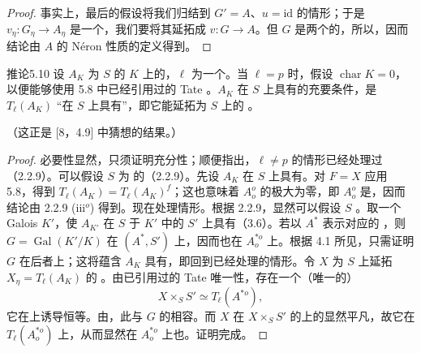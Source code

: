 \begin{proof}
事实上，最后的假设将我们归结到 $G'=A$、$u=\mathrm{id}$ 的情形；于是 $v_\eta:G_\eta\to A_\eta$ 是一个，我们要将其延拓成 $v:G\to A$。但 $G$ 是两个的，所以，因而结论由 $A$ 的 Néron 性质的定义得到。
\end{proof}

\begin{SGAresult}{推论}{5.10}
设 $A_K$ 为 $S$ 的 $K$ 上的，$\ell$ 为一个。当 $\ell=p$ 时，假设 $\operatorname{char}K=0$，以便能够使用 5.8 中已经引用过的 Tate 。$A_K$ 在 $S$ 上具有的充要条件，是  $T_\ell(A_K)$ “在 $S$ 上具有”，即它能延拓为 $S$ 上的 。
\end{SGAresult}
（这正是 [8，4.9] 中猜想的结果。）
\begin{proof}
必要性显然，只须证明充分性；顺便指出，$\ell\ne p$ 的情形已经处理过（2.2.9）。可以假设 $S$ 为  的（2.2.9）。先设 $A_K$ 在 $S$ 上具有。对 $F=X$ 应用 5.8，得到 $T_\ell(A_K)=T_\ell(A_K)^f$；这也意味着 $A_o^o$ 的极大为零，即 $A_o^o$ 是，因而结论由 2.2.9 (iii$^o$) 得到。现在处理情形。根据 2.2.9，显然可以假设 $S$ 。取一个 Galois  $K'$，使 $A_{K'}$ 在 $S$ 于 $K'$ 中的 $S'$ 上具有（3.6）。若以 $A^*$ 表示对应的 ，则 $G=\operatorname{Gal}(K'/K)$ 在 $(A^*,S')$ 上，因而也在
$A_o^{*o}$ 上。根据 4.1 所见，只需证明 $G$ 在后者上；这将蕴含 $A_K$ 具有，即回到已经处理的情形。令 $X$ 为 $S$ 上延拓 $X_\eta=T_\ell(A_K)$ 的 。由已引用过的 Tate 唯一性，存在一个（唯一的）
\[
X\times_S S'\simeq T_\ell(A^{*o}),
\]
它在上诱导恒等。由，此与 $G$ 的相容。而 $X$ 在 $X\times_S S'$ 的上的显然平凡，故它在 $T_\ell(A_o^{*o})$ 上，从而显然在 $A_o^{*o}$ 上也。证明完成。
\end{proof}

